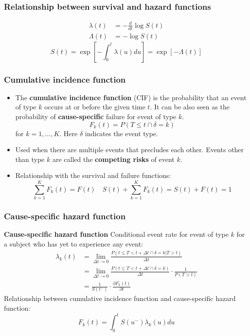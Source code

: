 \documentclass[11pt, aspectratio = 169]{beamer}
\begin{document}
\begin{frame}
  \frametitle{Relationship between survival and hazard functions}
  \begin{align*}
    \lambda(t) & = -\frac{d}{dt}\log S(t) \\
    \Lambda(t) & = -\log S(t)
  \end{align*}
  \begin{equation*}
    S(t) = \exp\left[-\int_{0}^{t}\lambda(u)du\right] = \exp\left[-\Lambda(t)\right]
  \end{equation*}
\end{frame}

\begin{frame}
  \frametitle{Cumulative incidence function}
  \begin{itemize}
    \item The \textbf{cumulative incidence function} (CIF) is the probability that an event of type $k$ occurs at or before the given time $t$. It can be also seen as the probability of \textbf{cause-specific} failure for event of type $k$.
    \begin{equation*}
      F_k(t) = P(T \le t \cap \delta = k)
    \end{equation*}
    for $k = 1,\dotsc,K$.
    Here $\delta$ indicates the event type.
    \item Used when there are multiple events that precludes each other. Events other than type $k$ are called the \textbf{competing risks} of event $k$.
    \item Relationship with the survival and failure functions:
    \begin{equation*}
      \sum_{k = 1}^{K}F_k(t) = F(t) \quad S(t) + \sum_{k = 1}^{K}F_k(t) = S(t) + F(t) = 1
    \end{equation*}
  \end{itemize}
\end{frame}

\begin{frame}
  \frametitle{Cause-specific hazard function}
  \textbf{Cause-specific hazard function} Conditional event rate for event of type $k$ for a subject who has yet to experience any event:
  \begin{equation*}
    \begin{split}
      \lambda_k(t) & = \lim_{\Delta t \to 0}\frac{P(t \le T < t + \Delta t \cap \delta = k| T > t)}{\Delta t} \\
      & = \lim_{\Delta t \to 0}\frac{P(t \le T < t + \Delta t \cap \delta = k)}{\Delta t} \cdot \frac{1}{P(T > t)} \\
      & = \frac{1}{S(t^-)} \cdot \frac{\partial F_k(t)}{\partial t}
    \end{split}
  \end{equation*}
  Relationship between cumulative incidence function and cause-specific hazard function:
  \begin{equation*}
    F_k(t) = \int_0^t S(u^-)\lambda_k(u)du
  \end{equation*}
\end{frame}
\end{document}
